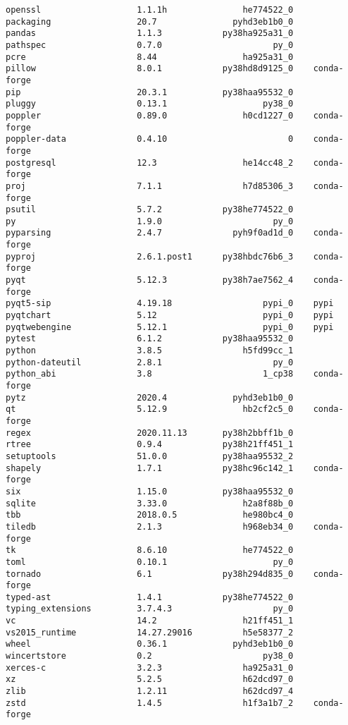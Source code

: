 \begin{Verbatim}
openssl                   1.1.1h               he774522_0
packaging                 20.7               pyhd3eb1b0_0
pandas                    1.1.3            py38ha925a31_0
pathspec                  0.7.0                      py_0
pcre                      8.44                 ha925a31_0
pillow                    8.0.1            py38hd8d9125_0    conda-forge
pip                       20.3.1           py38haa95532_0
pluggy                    0.13.1                   py38_0
poppler                   0.89.0               h0cd1227_0    conda-forge
poppler-data              0.4.10                        0    conda-forge
postgresql                12.3                 he14cc48_2    conda-forge
proj                      7.1.1                h7d85306_3    conda-forge
psutil                    5.7.2            py38he774522_0
py                        1.9.0                      py_0
pyparsing                 2.4.7              pyh9f0ad1d_0    conda-forge
pyproj                    2.6.1.post1      py38hbdc76b6_3    conda-forge
pyqt                      5.12.3           py38h7ae7562_4    conda-forge
pyqt5-sip                 4.19.18                  pypi_0    pypi
pyqtchart                 5.12                     pypi_0    pypi
pyqtwebengine             5.12.1                   pypi_0    pypi
pytest                    6.1.2            py38haa95532_0
python                    3.8.5                h5fd99cc_1
python-dateutil           2.8.1                      py_0
python_abi                3.8                      1_cp38    conda-forge
pytz                      2020.4             pyhd3eb1b0_0
qt                        5.12.9               hb2cf2c5_0    conda-forge
regex                     2020.11.13       py38h2bbff1b_0
rtree                     0.9.4            py38h21ff451_1
setuptools                51.0.0           py38haa95532_2
shapely                   1.7.1            py38hc96c142_1    conda-forge
six                       1.15.0           py38haa95532_0
sqlite                    3.33.0               h2a8f88b_0
tbb                       2018.0.5             he980bc4_0
tiledb                    2.1.3                h968eb34_0    conda-forge
tk                        8.6.10               he774522_0
toml                      0.10.1                     py_0
tornado                   6.1              py38h294d835_0    conda-forge
typed-ast                 1.4.1            py38he774522_0
typing_extensions         3.7.4.3                    py_0
vc                        14.2                 h21ff451_1
vs2015_runtime            14.27.29016          h5e58377_2
wheel                     0.36.1             pyhd3eb1b0_0
wincertstore              0.2                      py38_0
xerces-c                  3.2.3                ha925a31_0
xz                        5.2.5                h62dcd97_0
zlib                      1.2.11               h62dcd97_4
zstd                      1.4.5                h1f3a1b7_2    conda-forge
\end{Verbatim}

